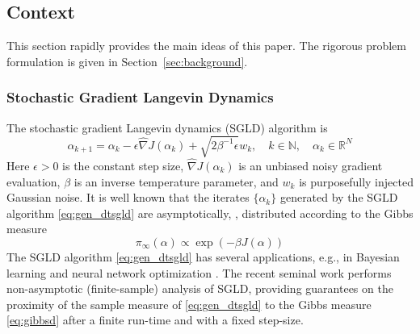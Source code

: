 \documentclass[journal,onecolumn]{IEEEtran}
\newcommand{\alk}{\alpha_k}
\newcommand{\alkk}{\alpha_{k+1}}
\newcommand{\step}{\epsilon}
\newcommand{\gradn}{\hat{\nabla}}
\newcommand{\rew}{J}
\newcommand{\reals}{\mathbb{R}}
\newcommand{\noisek}{w_k}
\newcommand{\dimn}{N}
\newcommand{\gibbs}{\ids_{\infty}}
\newcommand{\N}{\mathbb{N}}
\newcommand{\ids}{\pi}
\begin{document}
\vspace{-0.3cm}
\subsection{Context}
This section rapidly provides the main ideas of this paper. The rigorous problem formulation is given in Section~\ref{sec:background}.
\subsubsection{Stochastic Gradient Langevin Dynamics}

The stochastic gradient Langevin dynamics (SGLD) algorithm is
\begin{equation}
\label{eq:gen_dtsgld}
    \alkk = \alk - \step \gradn\rew(\alk) + \sqrt{2 \beta^{-1} \step}\noisek, \quad k\in  \N, \quad \alk \in \reals^{\dimn}
\end{equation}
Here $\step >0$ is the constant step size, $\gradn\rew(\alk)$ is an unbiased noisy gradient evaluation, $\beta$ is an inverse temperature parameter, and $w_k$ is purposefully injected Gaussian noise. It is well known \cite{karatzas1991brownian} that the iterates $\{\alk\}$ generated by the SGLD algorithm \eqref{eq:gen_dtsgld} are asymptotically, \color{black}{ as $\step \to 0, \, k \to \infty$}, distributed according to the Gibbs measure 
\begin{equation}
\label{eq:gibbsd}
    \gibbs(\alpha) \propto \exp(-\beta \rew(\alpha))
\end{equation}
The SGLD algorithm \eqref{eq:gen_dtsgld} has several applications, e.g., in Bayesian learning \cite{welling2011bayesian} and neural network optimization \cite{li2016preconditioned}. The recent seminal work \cite{raginsky2017non} performs non-asymptotic (finite-sample) analysis of SGLD, providing guarantees on the proximity of the sample measure of \eqref{eq:gen_dtsgld} to the Gibbs measure \eqref{eq:gibbsd} after a finite run-time {\color{black}and with a fixed step-size}.
\end{document}
